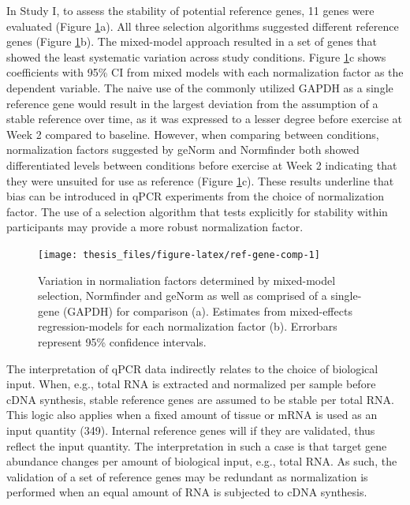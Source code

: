 \documentclass[twoside,10pt]{gihclass} %
\begin{document}
In Study I, to assess the stability of potential reference genes, 11 genes were evaluated (Figure \ref{fig:ref-gene-comp}a). All three selection algorithms suggested different reference genes (Figure \ref{fig:ref-gene-comp}b). The mixed-model approach resulted in a set of genes that showed the least systematic variation across study conditions. Figure \ref{fig:ref-gene-comp}c shows coefficients with 95\% CI from mixed models with each normalization factor as the dependent variable. The naive use of the commonly utilized GAPDH as a single reference gene would result in the largest deviation from the assumption of a stable reference over time, as it was expressed to a lesser degree before exercise at Week 2 compared to baseline. However, when comparing between conditions, normalization factors suggested by geNorm and Normfinder both showed differentiated levels between conditions before exercise at Week 2 indicating that they were unsuited for use as reference (Figure \ref{fig:ref-gene-comp}c). These results underline that bias can be introduced in qPCR experiments from the choice of normalization factor. The use of a selection algorithm that tests explicitly for stability within participants may provide a more robust normalization factor.
\begin{figure}

{\centering \texttt{[image: thesis\_files/figure-latex/ref-gene-comp-1]} 

}

\caption[Reference gene selection in Study I]{Variation in normaliation factors determined by mixed-model selection, Normfinder and geNorm as well as comprised of a single-gene (GAPDH) for comparison (a). Estimates from mixed-effects regression-models for each normalization factor (b). Errorbars represent 95\% confidence intervals.}\label{fig:ref-gene-comp}
\end{figure}
The interpretation of qPCR data indirectly relates to the choice of biological input. When, e.g., total RNA is extracted and normalized per sample before cDNA synthesis, stable reference genes are assumed to be stable per total RNA. This logic also applies when a fixed amount of tissue or mRNA is used as an input quantity
(349).
Internal reference genes will if they are validated, thus reflect the input quantity. The interpretation in such a case is that target gene abundance changes per amount of biological input, e.g., total RNA.
As such, the validation of a set of reference genes may be redundant as normalization is performed when an equal amount of RNA is subjected to cDNA synthesis.
\end{document}
